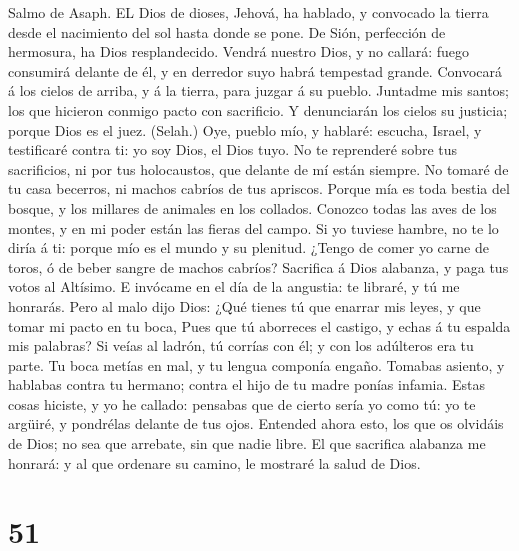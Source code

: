  Salmo de Asaph. EL Dios de dioses, Jehová, ha hablado, y
convocado la tierra desde el nacimiento del sol hasta donde se pone.
 De Sión, perfección de hermosura, ha Dios resplandecido.
 Vendrá nuestro Dios, y no callará: fuego consumirá delante
de él, y en derredor suyo habrá tempestad grande.  Convocará
á los cielos de arriba, y á la tierra, para juzgar á su pueblo.
 Juntadme mis santos; los que hicieron conmigo pacto con
sacrificio.  Y denunciarán los cielos su justicia; porque
Dios es el juez. (Selah.)  Oye, pueblo mío, y hablaré:
escucha, Israel, y testificaré contra ti: yo soy Dios, el Dios tuyo.
 No te reprenderé sobre tus sacrificios, ni por tus
holocaustos, que delante de mí están siempre.  No tomaré de
tu casa becerros, ni machos cabríos de tus apriscos. 
Porque mía es toda bestia del bosque, y los millares de animales en los
collados.  Conozco todas las aves de los montes, y en mi
poder están las fieras del campo.  Si yo tuviese hambre, no
te lo diría á ti: porque mío es el mundo y su plenitud. 
¿Tengo de comer yo carne de toros, ó de beber sangre de machos cabríos?
 Sacrifica á Dios alabanza, y paga tus votos al Altísimo.
 E invócame en el día de la angustia: te libraré, y tú me
honrarás.  Pero al malo dijo Dios: ¿Qué tienes tú que
enarrar mis leyes, y que tomar mi pacto en tu boca,  Pues
que tú aborreces el castigo, y echas á tu espalda mis palabras?
 Si veías al ladrón, tú corrías con él; y con los adúlteros
era tu parte.  Tu boca metías en mal, y tu lengua componía
engaño.  Tomabas asiento, y hablabas contra tu hermano;
contra el hijo de tu madre ponías infamia.  Estas cosas
hiciste, y yo he callado: pensabas que de cierto sería yo como tú: yo te
argüiré, y pondrélas delante de tus ojos.  Entended ahora
esto, los que os olvidáis de Dios; no sea que arrebate, sin que nadie
libre.  El que sacrifica alabanza me honrará: y al que
ordenare su camino, le mostraré la salud de Dios.

\hypertarget{section-50}{%
\section{51}\label{section-50}}

